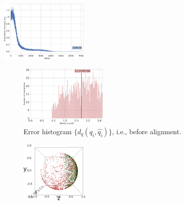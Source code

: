 \begin{figure}[ht!]
    \begin{minipage}[t]{0.27\linewidth}
        \centering
        \includegraphics[height=3cm]{figures/5j0n_perfect_angle_recovery}
        \caption{%
            Example of perfect orientation recovery (for \texttt{5j0n}).
            The loss $L_\text{OR}$  converges to zero when the distance estimation is perfect, i.e., $d_p(\p_i, \p_j) = d_q(q_i, q_j)$.
        }\label{fig:5j0n-orientation-recovery-loss}
    \end{minipage}
    \hfill
    \begin{minipage}[t]{0.70\linewidth}
        \begin{subfigure}[t]{4.3cm}
            \centering
            \includegraphics[height=3cm]{figures/5j0n_perfect_angle_ralignment_before}
            \caption{Error histogram $\{ d_q (q_i, \widehat{q_i}) \}$, i.e., before alignment.}
        \end{subfigure}
        \hfill
        \begin{subfigure}[t]{3.4cm}
            \centering
            \includegraphics[height=3cm]{figures/coverage_alignment_before.png}

\end{subfigure}
\end{minipage}
\end{figure}
